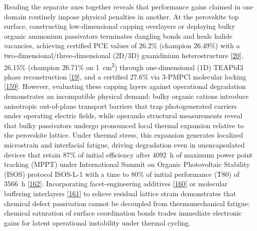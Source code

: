 \documentclass[
  11pt,
]{article}
\begin{document}
Reading the separate axes together reveals that performance gains
claimed in one domain routinely impose physical penalties in another. At
the perovskite top surface, constructing low-dimensional capping
overlayers or deploying bulky organic ammonium passivators terminates
dangling bonds and heals halide vacancies, achieving certified PCE
values of 26.2\% (champion 26.49\%) with a
two-dimensional/three-dimensional (2D/3D) guanidinium heterostructure
{[}\href{https://doi.org/10.1002/anie.8890696}{20}{]}, 26.15\% (champion
26.71\% on \qty{1}{\centi\meter\squared}) through one-dimensional (1D)
TEAPbI3 phase reconstruction
{[}\href{https://doi.org/10.1038/s41467-026-72790-1}{19}{]}, and a
certified 27.6\% via 3-PMPCl molecular locking
{[}\href{https://doi.org/10.1126/science.aeb9953}{159}{]}. However,
evaluating these capping layers against operational degradation
demonstrates an incompatible physical demand: bulky organic cations
introduce anisotropic out-of-plane transport barriers that trap
photogenerated carriers under operating electric fields, while operando
structural measurements reveal that bulky passivators undergo pronounced
local thermal expansion relative to the perovskite lattice. Under
thermal stress, this expansion generates localized microstrain and
interfacial fatigue, driving degradation even in unencapsulated devices
that retain 87\% of initial efficiency after \qty{4092}{\hour} of
maximum power point tracking (MPPT) under International Summit on
Organic Photovoltaic Stability (ISOS) protocol ISOS-L-1 with a time to
80\% of initial performance (T80) of \qty{3566}{\hour}
{[}\href{https://doi.org/10.1126/sciadv.aef6596}{162}{]}. Incorporating
facet-engineering additives
{[}\href{https://doi.org/10.1002/adma.73539}{160}{]} or molecular
buffering interlayers
{[}\href{https://doi.org/10.1002/adma.202519339}{161}{]} to relieve
residual lattice strain demonstrates that chemical defect passivation
cannot be decoupled from thermomechanical fatigue: chemical saturation
of surface coordination bonds trades immediate electronic gains for
latent operational instability under thermal cycling.
\end{document}
